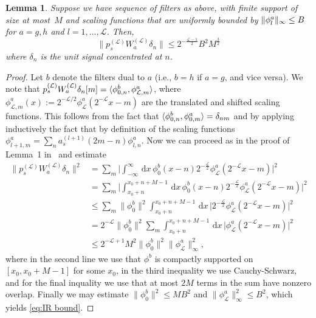 \documentclass[submission, Phys]{SciPost}
\newtheorem{lem}{Lemma}\crefname{lem}{Lemma}{Lemmas}
\theoremstyle{definition}
\theoremstyle{remark}
\DeclarePairedDelimiter{\norm}{\lVert}{\rVert}
\DeclarePairedDelimiter{\braket}{\langle}{\rangle}
\renewcommand{\d}{\ensuremath{\mathrm{d}}}
\newcommand{\cL}{\mathcal L}
\begin{document}
\begin{appendix}
\begin{lem}\label{lem:IR bound}
Suppose we have sequence of filters as above, with finite support of size at most~$M$ and scaling functions that are uniformly bounded by $\norm{\phi^a_l}_\infty \leq B$ for $a=g,h$ and $l=1,\dots,\cL$.
Then,
\begin{equation}\label{eq:IR bound}
  \lVert p^{(\cL)}_s W_a^{(\cL)} \delta_n \rVert \leq 2^{-\frac{\cL - 1}{2}} B^2 M^{\frac32}
\end{equation}
where $\delta_n$ is the unit signal concentrated at $n$.
\end{lem}
\begin{proof}
Let $b$ denote the filters dual to $a$ (i.e., $b=h$ if $a=g$, and vice versa).
We note that
$p^{(\cL)}_s W_a^{(\cL)}\delta_n[m] = \braket{\phi^b_{0,n}, \phi^a_{\cL,m}}$, where $\phi^a_{\cL,m}(x) := 2^{-\cL/2} \phi^a_\cL(2^{-\cL} x - m)$ are the translated and shifted scaling functions.
This follows from the fact that $\braket{\phi^b_{0,n}, \phi^a_{0,m}} = \delta_{nm}$ and by applying inductively the fact that by definition of the scaling functions $\phi^a_{l+1,m} = \sum_n a_s^{(l+1)}(2m - n)\phi^a_{l,n}$.
Now we can proceed as in the proof of Lemma~1 in~\cite{haegeman2018rigorous} and estimate
\begin{equation*}\begin{aligned}
  \lVert p^{(\cL)}_s W_a^{(\cL)} \delta_n \rVert^2
  &=  \sum_m \bigl\lvert \int_{-\infty}^{\infty} \,\d x\, \phi^b_{0}(x - n) 2^{-\frac{\cL}{2}}\phi^a_{\cL}(2^{-\cL}x - m) \bigr\rvert^2  \\
  &=  \sum_m \bigl\lvert \int_{x_0 +n}^{x_0 + n+M - 1} \,\d x\, \phi^b_{0}(x - n) 2^{-\frac{\cL}{2}}\phi^a_{\cL}(2^{-\cL}x - m) \bigr\rvert^2  \\
  &\leq \sum_m \lVert \phi^b_{0} \rVert^2 \int_{x_0 +n}^{x_0 + n+M - 1} \,\d x\, \lvert 2^{-\frac{\cL}{2}}\phi^a_{\cL}(2^{-\cL}x - m)\rvert^2  \\
  &= 2^{-\cL} \lVert \phi^b_{0} \rVert^2 \sum_m \int_{x_0 +n}^{x_0 + n+M - 1} \,\d x\, \lvert \phi^a_{\cL}(2^{-\cL}x - m)\rvert^2  \\
  &\leq 2^{-\cL + 1} M^2 \lVert \phi^b_{0} \rVert^2 \lVert \phi^a_{\cL} \rVert_{\infty}^2,
\end{aligned}\end{equation*}
where in the second line we use that $\phi^b$ is compactly supported on $[x_0, x_0 + M -1]$ for some $x_0$, in the third inequality we use Cauchy-Schwarz, and for the final inquality we use that at most $2M$ terms in the sum have nonzero overlap.
Finally we may estimate $\lVert \phi^b_{0} \rVert^2 \leq M B^2$ and $\lVert \phi^a_{\cL} \rVert_{\infty}^2 \leq B^2$, which yields \cref{eq:IR bound}.
\end{proof}


\end{appendix}
\end{document}
